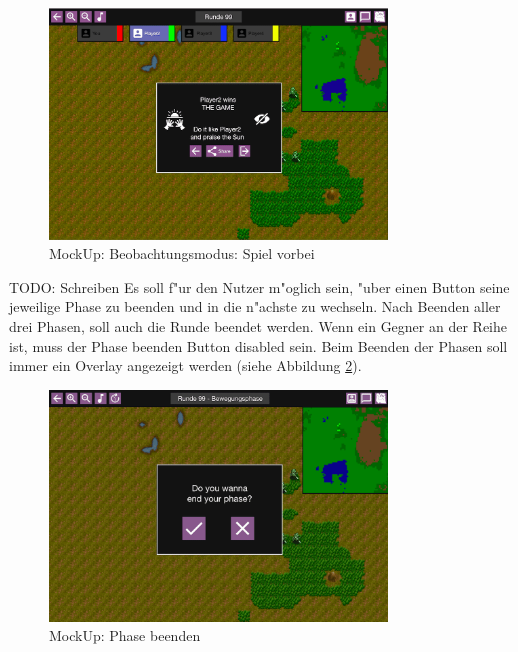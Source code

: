 \documentclass[12pt, titlepage]{scrartcl}
\newcounter{subsubsubsection}[subsubsection]
\begin{document}
			        \begin{figure}[H] 
    				    \centering
    				    \includegraphics[width=0.8\textwidth]{images/mockUps/SpactatorEnd.png}
    				    \caption{MockUp: Beobachtungsmodus: Spiel vorbei}
    				    \label{Spactator_End}
			        \end{figure}
			     \label{MockUps_Sidebar_Section}
			        TODO: Schreiben
			        Es soll f"ur den Nutzer m"oglich sein, "uber einen Button seine jeweilige Phase zu beenden und in die n"achste zu wechseln. Nach Beenden aller drei Phasen, soll auch die Runde beendet werden. Wenn ein Gegner an der Reihe ist, muss der Phase beenden Button disabled sein. Beim Beenden der Phasen soll immer ein Overlay angezeigt werden (siehe Abbildung \ref{Phase_End}). \\
			        \begin{figure}[H] 
    				    \centering
    				    \includegraphics[width=0.8\textwidth]{images/mockUps/EndPhase.png}
    				    \caption{MockUp: Phase beenden}
    				    \label{Phase_End}
			        \end{figure}
\end{document}
